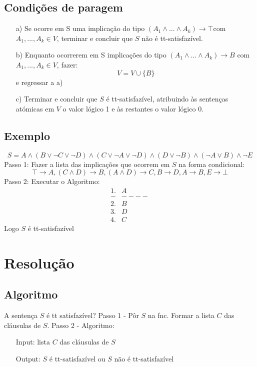 \documentclass[10pt,a4paper]{report}
\begin{document}
\subsection{Condições de paragem}
\begin{itemize}
\item[a)] Se ocorre em S uma implicação do tipo $(A_1 \land ... \land A_k ) \rightarrow \top $com $A_1, ... ,
A_k \in V$, terminar e concluir que $S$ não é tt-satisfazível.
\item[b)] Enquanto ocorrerem em S implicações do tipo $(A_1 \land ... \land A_k ) \rightarrow B $ com $A_1, ..., A_k \in V$, fazer:
$$
V = V \cup \{B\}
$$
e regressar a a)
\item[c)] Terminar e concluir que $S$ é tt-satisfazível, atribuindo às sentenças
atómicas em $V$ o valor lógico 1 e às restantes o valor lógico 0.
\end{itemize}
\subsection{Exemplo}
$$
S = A \land (B \lor \neg C \lor \neg D) \land (C \lor \neg A \lor \neg D) \land (D \lor \neg B) \land(\neg A \lor B) \land \neg E
$$
Passo 1: Fazer a lista das implicações que ocorrem em $S$ na forma condicional:
$$
\top \rightarrow A, (C \land D) \rightarrow B, (A \land D) \rightarrow C, B \rightarrow D, A \rightarrow B, E \rightarrow \bot
$$
Passo 2: Executar o Algoritmo:
\begin{align}
1.& A\\
-& ----\\
2.& B\\
3.& D\\
4.& C
\end{align}
Logo $S$ é tt-satisfazível
\section{Resolução}
\subsection{Algoritmo}
A sentença $S$ é tt satisfazível?
Passo 1 - Pôr $S$ na fnc. Formar a lista $C$ das cláusulas  de $S$.
Passo 2 - Algoritmo:
\begin{itemize}
\item[Input:] lista $C$ das cláusulas de $S$
\item[Output:] $S$ é tt-satisfazível ou $S$ não é tt-satisfazível
\end{itemize}
\end{document}
